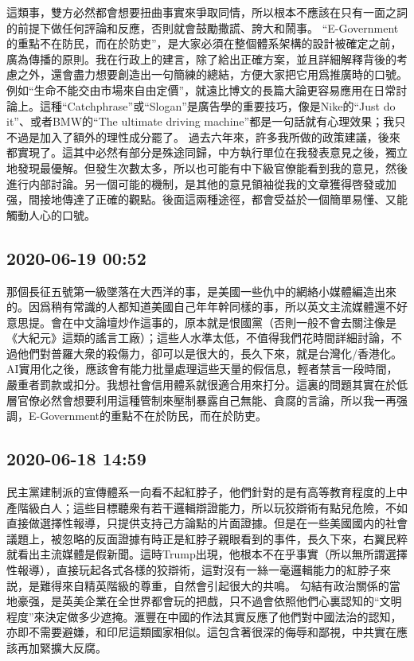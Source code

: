 \documentclass[twocolumn]{ctexart}
\begin{document}
這類事，雙方必然都會想要扭曲事實來爭取同情，所以根本不應該在只有一面之詞的前提下做任何評論和反應，否則就會鼓勵撒謊、誇大和鬧事。
“E-Government的重點不在防民，而在於防吏”，是大家必須在整個體系架構的設計被確定之前，廣為傳播的原則。我在行政上的建言，除了給出正確方案，並且詳細解釋背後的考慮之外，還會盡力想要創造出一句簡練的總結，方便大家把它用爲推廣時的口號。例如“生命不能交由市場來自由定價”，就遠比博文的長篇大論更容易應用在日常討論上。這種“Catchphrase”或“Slogan”是廣告學的重要技巧，像是Nike的“Just do it”、或者BMW的“The ultimate driving machine”都是一句話就有心理效果；我只不過是加入了額外的理性成分罷了。
過去六年來，許多我所做的政策建議，後來都實現了。這其中必然有部分是殊途同歸，中方執行單位在我發表意見之後，獨立地發現最優解。但發生次數太多，所以也可能有中下級官僚能看到我的意見，然後進行内部討論。另一個可能的機制，是其他的意見領袖從我的文章獲得啓發或加强，間接地傳達了正確的觀點。後面這兩種途徑，都會受益於一個簡單易懂、又能觸動人心的口號。
\subsection*{2020-06-19 00:52}

那個長征五號第一級墜落在大西洋的事，是美國一些仇中的網絡小媒體編造出來的。因爲稍有常識的人都知道美國自己年年幹同樣的事，所以英文主流媒體還不好意思提。會在中文論壇炒作這事的，原本就是恨國黨（否則一般不會去關注像是《大紀元》這類的謠言工廠）；這些人水準太低，不值得我們花時間詳細討論，不過他們對普羅大衆的殺傷力，卻可以是很大的，長久下來，就是台灣化/香港化。
AI實用化之後，應該會有能力批量處理這些天量的假信息，輕者禁言一段時間，嚴重者罰款或扣分。我想社會信用體系就很適合用來打分。這裏的問題其實在於低層官僚必然會想要利用這種管制來壓制暴露自己無能、貪腐的言論，所以我一再强調，E-Government的重點不在於防民，而在於防吏。
\subsection*{2020-06-18 14:59}

民主黨建制派的宣傳體系一向看不起紅脖子，他們針對的是有高等教育程度的上中產階級白人；這些目標聽衆有若干邏輯辯證能力，所以玩狡辯術有點兒危險，不如直接做選擇性報導，只提供支持己方論點的片面證據。但是在一些美國國内的社會議題上，被忽略的反面證據有時正是紅脖子親眼看到的事件，長久下來，右翼民粹就看出主流媒體是假新聞。這時Trump出現，他根本不在乎事實（所以無所謂選擇性報導），直接玩起各式各樣的狡辯術，這對沒有一絲一毫邏輯能力的紅脖子來説，是難得來自精英階級的尊重，自然會引起很大的共鳴。
勾結有政治關係的當地豪强，是英美企業在全世界都會玩的把戲，只不過會依照他們心裏認知的“文明程度”來決定做多少遮掩。滙豐在中國的作法其實反應了他們對中國法治的認知，亦即不需要避嫌，和印尼這類國家相似。這包含著很深的侮辱和鄙視，中共實在應該再加緊擴大反腐。
\end{document}
